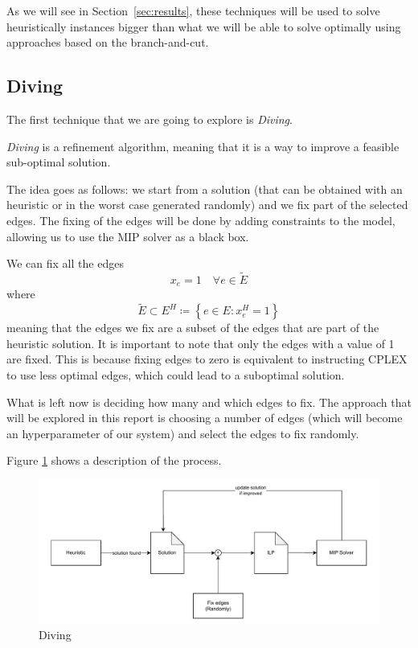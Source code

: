 \documentclass{article}
\begin{document}
As we will see in Section~\ref{sec:results}, these techniques will be used to solve
heuristically instances bigger than what we will be able to solve optimally using approaches
based on the branch-and-cut.

\subsection{Diving}
The first technique that we are going to explore is \textit{Diving}.

\textit{Diving} is a refinement algorithm, meaning that it is a way to improve a feasible
sub-optimal solution.

The idea goes as follows: we start from a solution (that can be obtained with an heuristic or in
the worst case generated randomly) and we fix part of the selected edges. The fixing of the
edges will be done by adding constraints to the model, allowing us to use the MIP solver
as a black box.

We can fix all the edges
\begin{equation*}
  x_{e}=1 \quad \forall e \in \tilde{E}
\end{equation*}
where
\begin{equation*}
  \tilde{E} \subset E^{H} \coloneq \left\{ e \in E : x_{e}^{H} = 1 \right\}
\end{equation*}
meaning that the edges we fix are a subset of the edges that are part of the heuristic solution.
It is important to note that only the edges with a value of 1 are fixed. This is because fixing
edges to zero is equivalent to instructing CPLEX to use less optimal edges, which could lead to a suboptimal solution.

What is left now is deciding how many and which edges to fix. The approach that will be explored
in this report is choosing a number of edges (which will become an hyperparameter of our system)
and select the edges to fix randomly.

Figure \ref{fig:diving} shows a description of the process.

\begin{figure}[H]
        \caption{Diving}
        \label{fig:diving}
        \centering
        \includegraphics[width=340pt]{assets/diving.drawio.pdf}
\end{figure}
\end{document}
